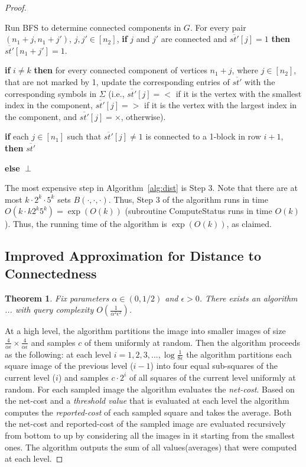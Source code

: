 \documentclass[11pt,english]{article}
\newtheorem{theorem}{Theorem}[section]
\numberwithin{figure}{section}
\newcommand{\Compst}{{\sf ComputeStatus}\xspace}
\newcommand{\mydelta}{\epsilon} \newcommand{\bigdelta}{{\epsilon_0}} \newcommand{\dsquares}{d_{\rm squares}}
\begin{document}
\begin{proof}
\begin{algorithm}
\nl Run BFS to determine connected components in $G$. For every pair $(n_1+j,n_1+j')$, $j,j'\in[n_2]$, \textbf{if} $j$ and $j'$ are connected and $\overline{st'}[j]=1$ \textbf{then} $\overline{st'}[n_1+j']=1$.

\nl \textbf{if} $i\neq k$ \textbf{then} for every connected component of vertices $n_1+j$, where $j\in[n_2]$, that are not marked by 1, update the corresponding entries of $\overline{st'}$ with the corresponding symbols in $\Sigma$ (i.e., $\overline{st'}[j]=<$ if it is the vertex with the smallest index in the component, $\overline{st'}[j]=>$ if it is the vertex with the largest index in the component, and $\overline{st'}[j]=\times$, otherwise).

\nl \textbf{if} each $j\in[n_1]$ such that $\overline{st'}[j]\neq 1$ is connected to a 1-block in row $i+1$, \textbf{then} \Return $\overline{st'}$

\nl \textbf{else} \Return $\perp$

\end{algorithm}
The most expensive step in Algorithm~\ref{alg:dist} is Step 3. Note that there are at most $k\cdot2^k\cdot5^k$ sets $B(\cdot,\cdot,\cdot)$. Thus, Step 3 of the algorithm runs in time $O( k\cdot k2^k5^k)=\exp \left (O(k)\right)$ (subroutine \Compst runs in time $O(k)$). Thus, the running time of the algorithm is $\exp \left (O(k)\right)$, as claimed.


\subsection{Improved Approximation for Distance to Connectedness}\label{sec:improved-approximation-for-connectedness}
\begin{theorem}
Fix parameters $\alpha\in(0,1/2)$ and $\mydelta>0$. There exists an algorithm ...
with query complexity $O(\frac{1}{\alpha^{2}\mydelta^{2}})$.
\end{theorem}
At a high level, the algorithm partitions the image into smaller images of size $\frac{4}{\alpha\mydelta}\times\frac{4}{\alpha\mydelta}$ and samples $c$ of them uniformly at random. Then the algorithm proceeds as the following: at each level $i=1,2,3,...,\log\frac{1}{8\mydelta}$ the algorithm partitions each square image of the previous level ($i-1$) into four equal sub-squares of the current level ($i$) and samples $c\cdot2^{i}$ of all squares of the current level uniformly at random. For each sampled image the algorithm evaluates the \emph{net-cost}. Based on the net-cost and a \emph{threshold value} that is evaluated at each level the algorithm computes the \emph{reported-cost} of each sampled square and takes the average. Both the net-cost and reported-cost of the sampled image are evaluated recursively from bottom to up by considering all the images in it starting from the smallest ones. The algorithm outputs the sum of all values(averages) that were computed at each level.


\end{proof}
\end{document}

